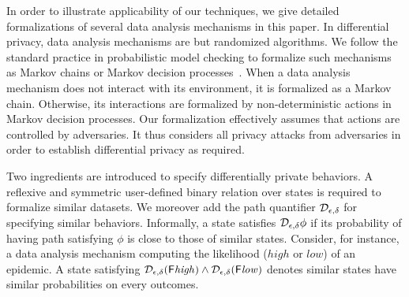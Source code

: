 In order to illustrate applicability of our techniques, we give
detailed formalizations of several data analysis mechanisms in this
paper.
In differential privacy, data analysis mechanisms are
but randomized algorithms. We follow the standard practice in
probabilistic model checking to formalize such mechanisms
as Markov chains or Markov decision processes~\cite{Put05}. 
When a data analysis mechanism does not
interact with its environment, it is formalized as a Markov
chain. Otherwise, its interactions are formalized by non-deterministic 
actions in
Markov decision processes. Our formalization effectively assumes that
actions are controlled by adversaries. It thus
considers all privacy attacks from adversaries in order to establish
differential privacy as required.


Two ingredients are introduced to specify differentially private
behaviors. A reflexive and symmetric user-defined binary relation
over states is required to formalize similar datasets. We moreover add
the path quantifier $\mathcal{D}_{{\epsilon}, {\delta}}$ for specifying similar
behaviors. Informally, a state satisfies $\mathcal{D}_{{\epsilon}, {\delta}}
\phi$ if its probability of having path satisfying $\phi$ is close to
those of similar states. Consider, for instance, a data analysis
mechanism computing the likelihood ($\mathit{high}$ or $\mathit{low}$)
of an epidemic. A state satisfying
$\mathcal{D}_{{\epsilon}, {\delta}} (\mathsf{F} \mathit{high}) \wedge
\mathcal{D}_{{\epsilon}, {\delta}} (\mathsf{F} \mathit{low})$ denotes similar states
have similar probabilities on every outcomes.



